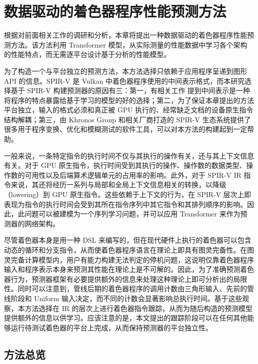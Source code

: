 \chapter{数据驱动的着色器程序性能预测方法}

\label{sec:begin_of_ch3}

根据对前面相关工作的调研和分析，本章将提出一种数据驱动的着色器程序性能预测方法。该方法利用 Transformer 模型，从实际测量的性能数据中学习各个架构的性能特点，而无需逐平台设计基于分析的性能模型。

为了构造一个与平台独立的预测方法，本方法选择只依赖于应用程序呈递到图形 API 的信息。SPIR-V \cite{SPIRV} 是 Vulkan 中着色器程序使用的中间表示格式，而本研究选择基于 SPIR-V 构建预测器的原因有三：第一，有相关工作 \cite{pmlr-v139-peng21b, Niu2023fair} 提到中间表示是一种将程序的特点暴露给基于学习的模型的好的选择；第二，为了保证本章提出的方法平台独立，输入的格式必须和真正被 GPU 执行的、经常缺乏文档的设备原生指令结构解耦；第三，由 Khronos Group 和相关厂商打造的 SPIR-V 生态系统提供了很多用于程序变换、优化和模糊测试的软件工具，可以对本方法的构建起到一定帮助。

一般来说，一条特定指令的执行时间不仅与其执行的操作有关，还与其上下文信息有关。对于 GPU 原生指令，执行时间受到其执行的操作、操作数的数据类型、操作数的可用性以及后端算术逻辑单元的占用率的影响。此外，对于 SPIR-V IR 指令来说，其还将经历一系列与局部和全局上下文信息相关的转换，以降级（lowering）到 GPU 原生指令。这些依赖于上下文的行为，在 SPIR-V 层次上即表现为指令的执行时间会受到其所在指令序列中其它指令和其排列顺序的影响。因此，此问题可以被建模为一个序列学习问题，并可以应用 Transformer\cite{Vaswani2017AttentionIA} 来作为预测器的网络架构。

尽管着色器本身是用一种 DSL 来编写的，但在现代硬件上执行的着色器可以包含动态的循环和分支指令，从而使着色器程序语言在理论上即具有图灵完备性。在图灵完备计算模型内，用户有能力构建无法判定的停机问题\cite{10.1112/plms/s2-42.1.230}，这说明仅靠着色器程序输入和程序表示本身来预测其性能在理论上是不可解的。因此，为了准确预测着色器行为，预测器框架有必要提供额外的信息来处理这种理论上即可分析出的局限性。同时可以注意到，管线后期的着色器程序的调用计数由三角形输入、先前的管线阶段和 Uniform 输入决定，而不同的计数会显著影响总执行时间。基于这些观察，本方法选择在 IR 的层次上进行着色器指令跟踪，从而为随后构造的预测模型提供额外的信息以供学习。应该注意的是，本文提出的跟踪阶段可以在任何其他能够运行待测试着色器的平台上完成，从而保持预测器的平台独立性。

\section{方法总览}

